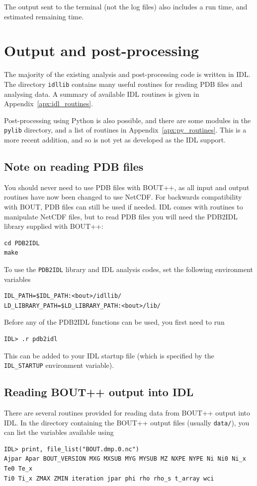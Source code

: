 \documentclass[12pt]{article}
\newcommand{\code}[1]{\texttt{#1}}
\begin{document}
The output sent to the terminal (not the log files) also includes a run time, and estimated
remaining time.

\section{Output and post-processing}
\label{sec:output}

The majority of the existing analysis and post-processing code is written
in IDL. The directory \texttt{idllib} contains many useful routines for
reading PDB files and analysing data. A summary of available IDL routines
is given in Appendix~\ref{apx:idl_routines}.

Post-processing using Python is also possible, and there are some modules
in the \texttt{pylib} directory, and a list of routines in Appendix~\ref{apx:py_routines}. 
This is a more recent addition, and so is not yet as developed as the IDL support. 



\subsection{Note on reading PDB files}

You should never need to use PDB files with BOUT++, as all input and output routines have now
been changed to use NetCDF. For backwards compatibility with BOUT, PDB files can still be used
if needed. IDL comes with routines to manipulate NetCDF files, but to read PDB files you will need the PDB2IDL library
supplied with BOUT++:
\begin{verbatim}
cd PDB2IDL
make
\end{verbatim}
To use the \code{PDB2IDL} library and IDL analysis codes, set the following environment variables
\begin{verbatim}
IDL_PATH=$IDL_PATH:<bout>/idllib/
LD_LIBRARY_PATH=$LD_LIBRARY_PATH:<bout>/lib/
\end{verbatim}
Before any of the PDB2IDL functions can be used, you first need to run
\begin{verbatim}
IDL> .r pdb2idl
\end{verbatim}
This can be added to your IDL startup file (which is specified by the
\code{IDL\_STARTUP} environment variable).

\subsection{Reading BOUT++ output into IDL}
There are several routines provided for reading data from BOUT++ output into
IDL. In the directory containing the BOUT++ output files
(usually \texttt{data/}), you can list the variables available using
\begin{verbatim}
IDL> print, file_list("BOUT.dmp.0.nc")
Ajpar Apar BOUT_VERSION MXG MXSUB MYG MYSUB MZ NXPE NYPE Ni Ni0 Ni_x Te0 Te_x
Ti0 Ti_x ZMAX ZMIN iteration jpar phi rho rho_s t_array wci
\end{verbatim}
\end{document}

